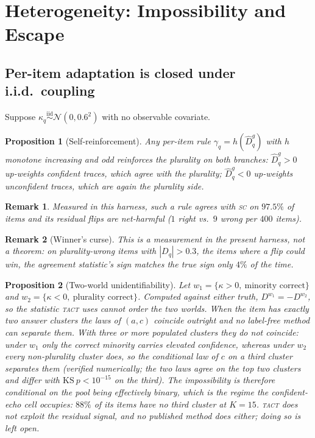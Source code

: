 \documentclass{article}
\newtheorem{proposition}{Proposition}
\newtheorem{remark}{Remark}
\newcommand{\Dhat}{\widehat{D}}
\newcommand{\SC}{\textsc{sc}}
\newcommand{\TACT}{\textsc{tact}}
\begin{document}
\section{Heterogeneity: Impossibility and Escape}\label{sec:hetero}

\subsection{Per-item adaptation is closed under i.i.d.\ coupling}
Suppose $\kappa_q\stackrel{\text{iid}}{\sim}\mathcal{N}(0,0.6^2)$ with no observable covariate.

\begin{proposition}[Self-reinforcement]\label{prop:selfreinf}
Any per-item rule $\gamma_q=h(\Dhat^g_q)$ with $h$ monotone increasing and odd reinforces the plurality on both branches: $\Dhat^g_q>0$ up-weights confident traces, which agree with the plurality; $\Dhat^g_q<0$ up-weights unconfident traces, which are again the plurality side.
\end{proposition}
\begin{remark}
Measured in this harness, such a rule agrees with \SC{} on $97.5\%$ of items and its residual flips are net-harmful ($1$ right vs.\ $9$ wrong per $400$ items).
\end{remark}

\begin{remark}[Winner's curse]\label{prop:curse}
This is a measurement in the present harness, not a theorem: on plurality-wrong items with $|D_q|>0.3$, the items where a flip could win, the agreement statistic's sign matches the true sign only $4\%$ of the time.
\end{remark}

\begin{proposition}[Two-world unidentifiability]\label{prop:twoworld}
Let $w_1=\{\kappa>0,\ \text{minority correct}\}$ and
$w_2=\{\kappa<0,\ \text{plurality correct}\}$. Computed against either truth,
$D^{w_1}=-D^{w_2}$, so the statistic \TACT{} uses cannot order the two worlds.
When the item has exactly two answer clusters the laws of $(a,c)$ coincide
outright and no label-free method can separate them. With three or more
\emph{populated} clusters they do not coincide: under $w_1$ only the correct
minority carries elevated confidence, whereas under $w_2$ every non-plurality
cluster does, so the conditional law of $c$ on a third cluster separates them
(verified numerically; the two laws agree on the top two clusters and differ
with $\mathrm{KS}\ p<10^{-15}$ on the third). The impossibility is therefore
conditional on the pool being effectively binary, which is the regime the
confident-echo cell occupies: $88\%$ of its items have no third cluster at
$K{=}15$. \TACT{} does not exploit the residual signal, and no published
method does either; doing so is left open.
\end{proposition}
\end{document}

